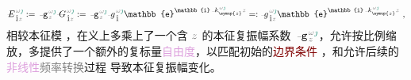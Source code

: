 \begin{subequations}
\begin{align}
		\xint{\mathcolor{gray}{-}}{30}{E}^{\;\!\mathcolor{gray}{\omega} \textcolor{PineGreen}{\jmath}}_{\;\! \hat{1} \mathcolor{gray}{z}} := \xint{\begin{smallmatrix} ~ \\ {}^{}_{\mathcolor{gray}{-}} \\ ~ \end{smallmatrix}}{09}{\mathtt{g}}^{\;\!\mathcolor{gray}{\omega} \textcolor{PineGreen}{\jmath}}_{\;\! \mathcolor{gray}{z}} \xint{\mathcolor{gray}{-}}{20}{G}^{\;\!\mathcolor{gray}{\omega} \textcolor{PineGreen}{\jmath}}_{\;\! \hat{1} \mathcolor{gray}{z}} := \xint{\begin{smallmatrix} ~ \\ {}^{}_{\mathcolor{gray}{-}} \\ ~ \end{smallmatrix}}{09}{\mathtt{g}}^{\;\!\mathcolor{gray}{\omega} \textcolor{PineGreen}{\jmath}}_{\;\! \mathcolor{gray}{z}} \xint{{}^{}_{\mathcolor{gray}{-}}}{10}{g}^{\;\!\mathcolor{gray}{\omega} \textcolor{PineGreen}{\jmath}}_{\;\! \hat{1}} \mathbb{e}^{\mathbb{i} \xint{\begin{smallmatrix} ~ \\ {}^{}_{\mathcolor{gray}{-}} \\ ~ \end{smallmatrix}}{15}{k}_{\symup{z}}^{\;\! \mathcolor{gray}{\omega} \textcolor{PineGreen}{\jmath}} \mathcolor{gray}{z}} =: \xint{{}^{}_{\mathcolor{gray}{-}}}{10}{g}^{\;\!\mathcolor{gray}{\omega} \textcolor{PineGreen}{\jmath}}_{\;\! \hat{1} \mathcolor{gray}{z}} \mathbb{e}^{\mathbb{i} \xint{\begin{smallmatrix} ~ \\ {}^{}_{\mathcolor{gray}{-}} \\ ~ \end{smallmatrix}}{15}{k}_{\symup{z}}^{\;\! \mathcolor{gray}{\omega} \textcolor{PineGreen}{\jmath}} \mathcolor{gray}{z}} ~, \label{eq:components-eigenwave}
	\end{align}
\end{subequations}
相较\textcolor{PineGreen}{本征模} ，在义上多乘上了一个含 $\mathcolor{gray}{z}$ 的\textcolor{PineGreen}{本征复振幅}系数 $\xint{\begin{smallmatrix} ~ \\ {}^{}_{\mathcolor{gray}{-}} \\ ~ \end{smallmatrix}}{09}{\mathtt{g}}^{\;\!\mathcolor{gray}{\omega} \textcolor{PineGreen}{\jmath}}_{\;\! \mathcolor{gray}{z}}$，允许按比例缩放，多提供了一个额外的复标量\textcolor{Plum}{自由度}，以匹配初始的\textcolor{Maroon}{边界条件} ，和允许后续的\textcolor{Plum}{非线性}\textcolor{gray}{频率转换}过程  导致\textcolor{PineGreen}{本征复振幅}变化。

